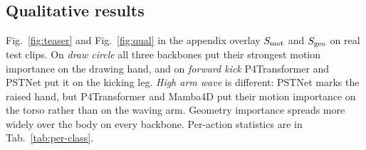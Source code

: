 \subsection{Qualitative results}
\label{sec:exp-qual}
Fig.~\ref{fig:teaser} and Fig.~\ref{fig:qual} in the appendix overlay $S_{\mathrm{mot}}$ and $S_{\mathrm{geo}}$ on real test clips. On \emph{draw circle} all three backbones put their strongest motion importance on the drawing hand, and on \emph{forward kick} P4Transformer and PSTNet put it on the kicking leg. \emph{High arm wave} is different: PSTNet marks the raised hand, but P4Transformer and Mamba4D put their motion importance on the torso rather than on the waving arm. Geometry importance spreads more widely over the body on every backbone. Per-action statistics are in Tab.~\ref{tab:per-class}.
